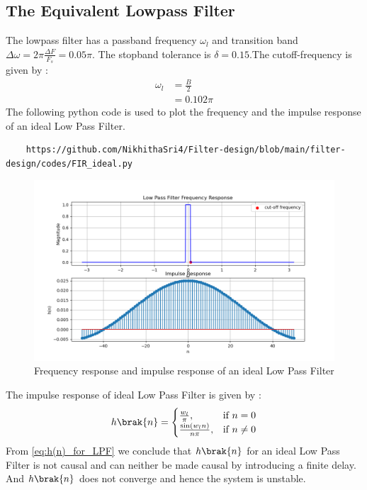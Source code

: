 \documentclass{article}
\begin{document}
\subsection{The Equivalent Lowpass Filter}
The lowpass filter has a passband frequency $\omega_l$ and transition band $\Delta \omega = 2\pi \frac{\Delta F}{F_s} = 0.05\pi$.
The stopband tolerance is $\delta=0.15$.The cutoff-frequency is given by :
\begin{align}
    \omega_{l} &= \frac{B}{2}\\
                &= 0.102\pi
\end{align}
The following python code is used to plot the frequency and the impulse response of an ideal Low Pass Filter.
\begin{lstlisting}
    https://github.com/NikhithaSri4/Filter-design/blob/main/filter-design/codes/FIR_ideal.py
\end{lstlisting}
\begin{figure}[H]
\centering
\includegraphics[width=1\columnwidth]{figs/LPF_FIR.png}
\caption{Frequency response and impulse response of an ideal Low Pass Filter}
\label{fig:LPF_FIR_1}
\end{figure}

The impulse response of ideal Low Pass Filter is given by :
\begin{align}
    h\brak{n} = 
\begin{cases} 
    \frac{w_l}{\pi}, & \text{if } n = 0 \\
    \frac{\sin(w_l n)}{n\pi}, & \text{if } n \neq 0
\end{cases} \label{eq:h(n)_for_LPF}
\end{align}
From \eqref{eq:h(n)_for_LPF} we conclude that $h\brak{n}$ for an ideal Low Pass Filter is not causal and can neither be made causal by introducing a finite delay. And $h\brak{n}$ does not converge and hence the system is unstable.
\end{document}

